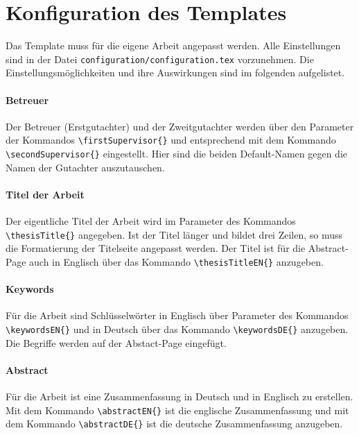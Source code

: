 %
\section{Konfiguration des Templates}\label{sec:configuraitons}
Das Template muss für die eigene Arbeit angepasst werden. Alle Einstellungen sind in der Datei \texttt{configuration/configuration.tex} vorzunehmen. Die Einstellungsmöglichkeiten und ihre Auswirkungen sind im folgenden aufgelistet.

\paragraph{Betreuer} Der Betreuer (Erstgutachter) und der Zweitgutachter werden über den Parameter der Kommandos \texttt{\textbackslash firstSupervisor\{\}} und entsprechend mit dem Kommando \texttt{\textbackslash secondSupervisor\{\}} eingestellt. Hier sind die beiden Default-Namen gegen die Namen der Gutachter auszutauschen.

\paragraph{Titel der Arbeit} Der eigentliche Titel der Arbeit wird im Parameter des Kommandos \texttt{\textbackslash thesisTitle\{\}} angegeben. Ist der Titel länger und bildet drei Zeilen, so muss die Formatierung der Titelseite angepasst werden. Der Titel ist für die Abstract-Page auch in Englisch über das Kommando \texttt{\textbackslash thesisTitleEN\{\}} anzugeben.

\paragraph{Keywords} Für die Arbeit sind Schlüsselwörter in Englisch über Parameter des Kommandos \texttt{\textbackslash keywordsEN\{\}} und in Deutsch über das Kommando \texttt{\textbackslash keywordsDE\{\}} anzugeben. Die Begriffe werden auf der Abstact-Page eingefügt.

\paragraph{Abstract} Für die Arbeit ist eine Zusammenfassung in Deutsch und in Englisch zu erstellen. Mit dem Kommando \texttt{\textbackslash abstractEN\{\}} ist die englische Zusammenfassung und mit dem Kommando \texttt{\textbackslash abstractDE\{\}} ist die
deutsche Zusammenfassung anzugeben.


